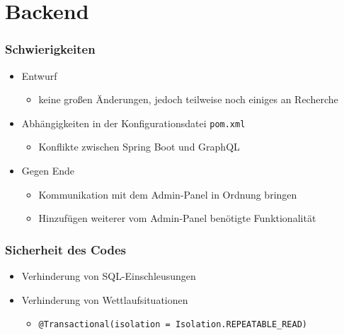 \section{Backend}

\begin{frame}\frametitle{Schwierigkeiten}
\begin{itemize}
	\item Entwurf
	\begin{itemize}
		\item keine großen Änderungen, jedoch teilweise noch einiges an Recherche
	\end{itemize}
	\item Abhängigkeiten in der Konfigurationsdatei \texttt{pom.xml}
	\begin{itemize}
		\item Konflikte zwischen Spring Boot und GraphQL
	\end{itemize}
	\item Gegen Ende
	\begin{itemize}
		\item Kommunikation mit dem Admin-Panel in Ordnung bringen
		\item Hinzufügen weiterer vom Admin-Panel benötigte Funktionalität
	\end{itemize}
\end{itemize}
\end{frame}

\begin{frame}\frametitle{Sicherheit des Codes}
\begin{itemize}
	\item Verhinderung von SQL-Einschleusungen
	\item Verhinderung von Wettlaufsituationen
	\begin{itemize}
		\item \texttt{@Transactional(isolation = Isolation.REPEATABLE\_READ)}
	\end{itemize}
\end{itemize}
\end{frame}
